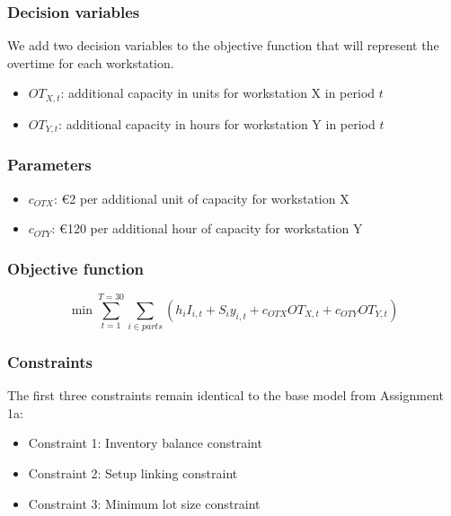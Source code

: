 \documentclass[a4paper,faculty=eb,language=en,doctype=article,sftitles=false]{ugent-doc}
\begin{document}
\subsubsection{Decision variables}

We add two decision variables to the objective function that will represent the overtime for each workstation.

\begin{itemize}
    \item \(OT_{X,t}\): additional capacity in units for workstation X in period \(t\)
    \item \(OT_{Y,t}\): additional capacity in hours for workstation Y in period \(t\)
\end{itemize}

\subsubsection{Parameters}

\begin{itemize}
    \item \(c_{OTX}\): €2 per additional unit of capacity for workstation X
    \item \(c_{OTY}\): €120 per additional hour of capacity for workstation Y
\end{itemize}

\subsubsection{Objective function}

\[
\min \sum_{t=1}^{T=30} \sum_{i \in parts}
\left(
h_i I_{i,t}
+ S_i y_{i,t}
+ c_{OTX} OT_{X,t}
+ c_{OTY} OT_{Y,t}
\right)
\]

\subsubsection{Constraints}

The first three constraints remain identical to the base model from Assignment 1a:

\begin{itemize}[noitemsep, topsep=0pt]
    \item Constraint 1: Inventory balance constraint
    \item Constraint 2: Setup linking constraint
    \item Constraint 3: Minimum lot size constraint
\end{itemize}
\end{document}
